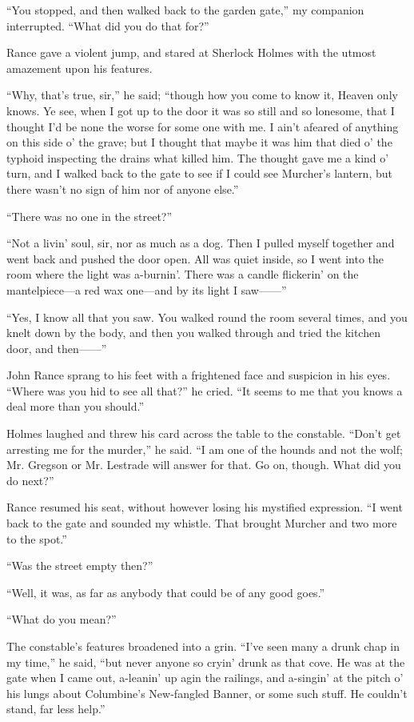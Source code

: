 \documentclass[12pt]{book}
\begin{document}
“You stopped, and then walked back to the garden gate,” my companion interrupted. “What did you do that for?” 

Rance gave a violent jump, and stared at Sherlock Holmes with the utmost amazement upon his features. 

“Why, that’s true, sir,” he said; “though how you come to know it, Heaven only knows. Ye see, when I got up to the door it was so still and so lonesome, that I thought I’d be none the worse for some one with me. I ain’t afeared of anything on this side o’ the grave; but I thought that maybe it was him that died o’ the typhoid inspecting the drains what killed him. The thought gave me a kind o’ turn, and I walked back to the gate to see if I could see Murcher’s lantern, but there wasn’t no sign of him nor of anyone else.” 

“There was no one in the street?” 

“Not a livin’ soul, sir, nor as much as a dog. Then I pulled myself together and went back and pushed the door open. All was quiet inside, so I went into the room where the light was a-burnin’. There was a candle flickerin’ on the mantelpiece—a red wax one—and by its light I saw——” 

“Yes, I know all that you saw. You walked round the room several times, and you knelt down by the body, and then you walked through and tried the kitchen door, and then——” 

John Rance sprang to his feet with a frightened face and suspicion in his eyes. “Where was you hid to see all that?” he cried. “It seems to me that you knows a deal more than you should.” 

Holmes laughed and threw his card across the table to the constable. “Don’t get arresting me for the murder,” he said. “I am one of the hounds and not the wolf; Mr. Gregson or Mr. Lestrade will answer for that. Go on, though. What did you do next?” 

Rance resumed his seat, without however losing his mystified expression. “I went back to the gate and sounded my whistle. That brought Murcher and two more to the spot.” 

“Was the street empty then?” 

“Well, it was, as far as anybody that could be of any good goes.” 

“What do you mean?” 

The constable’s features broadened into a grin. “I’ve seen many a drunk chap in my time,” he said, “but never anyone so cryin’ drunk as that cove. He was at the gate when I came out, a-leanin’ up agin the railings, and a-singin’ at the pitch o’ his lungs about Columbine’s New-fangled Banner, or some such stuff. He couldn’t stand, far less help.” 
\end{document}
